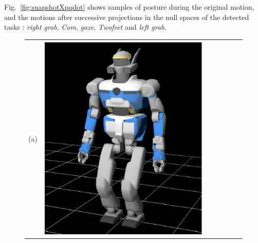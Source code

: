 \documentclass[letterpaper, 10pt, conference]{ieeeconf}      %
\begin{document}
Fig.~\ref{fig:snapshotXpqdot} shows samples of posture during the original motion,
and the motions after successive projections
in the null spaces of the detected
tasks : \emph{right grab}, \emph{Com}, \emph{gaze}, \emph{Twofeet} and \emph{left grab}.
\begin{figure}[t]
\centering
\begin{tabular}{c@{}c@{}c@{}c@{}c@{}c@{}c}
(a)&
\parbox[c]{2.4cm}{\includegraphics[width=\linewidth]{img/Pqdot0_0.png.ps}} &

\end{tabular}
\end{figure}
\end{document}
